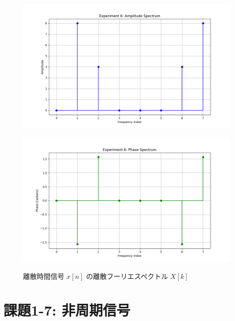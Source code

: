 \documentclass[fleqn, a4paper. 12pt]{jsarticle}
\begin{document}
  \begin{figure}[h]
    \begin{center}
    \begin{minipage}[t]{0.48\columnwidth}
        \includegraphics[width=\columnwidth]{amplitude_spectrum_experiment_6.png}
        \label{fign:a6}
    \end{minipage}
    \begin{minipage}[t]{0.48\columnwidth}
        \includegraphics[width=\columnwidth]{phase_spectrum_experiment_6.png}
        \label{fign:p6}
    \end{minipage}
    \end{center}
    \caption{離散時間信号 $x[n]$ の離散フーリエスペクトル $X[k]$}
  \end{figure}

  \newpage

  \section*{課題1-7: 非周期信号}
\end{document}
